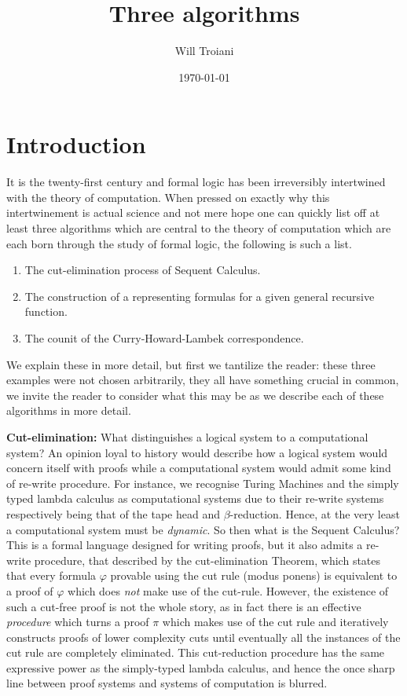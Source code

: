 \documentclass[12pt]{article}
\title{Three algorithms}
\author{Will Troiani}
\date{\today}
\theoremstyle{plain}
\theoremstyle{definition}
\begin{document}
	\maketitle
	\section{Introduction}
	It is the twenty-first century and formal logic has been irreversibly intertwined with the theory of computation. When pressed on exactly why this intertwinement is actual science and not mere hope one can quickly list off at least three algorithms which are central to the theory of computation which are each born through the study of formal logic, the following is such a list.
	\begin{enumerate}
		\item\label{cut_elimination} The cut-elimination process of Sequent Calculus.
		\item\label{representing_formula} The construction of a representing formulas for a given general recursive function.
		\item \label{counit} The counit of the Curry-Howard-Lambek correspondence.
	\end{enumerate}
	We explain these in more detail, but first we tantilize the reader: these three examples were not chosen arbitrarily, they all have something crucial in common, we invite the reader to consider what this may be as we describe each of these algorithms in more detail.
	
	\textbf{Cut-elimination:} What distinguishes a logical system to a computational system? An opinion loyal to history would describe how a logical system would concern itself with proofs while a computational system would admit some kind of re-write procedure. For instance, we recognise Turing Machines and the simply typed lambda calculus as computational systems due to their re-write systems respectively being that of the tape head and $\beta$-reduction. Hence, at the very least a computational system must be \emph{dynamic}. So then what is the Sequent Calculus? This is a formal language designed for writing proofs, but it also admits a re-write procedure, that described by the cut-elimination Theorem, which states that every formula $\varphi$ provable using the cut rule (modus ponens) is equivalent to a proof of $\varphi$ which does \emph{not} make use of the cut-rule. However, the existence of such a cut-free proof is not the whole story, as in fact there is an effective \emph{procedure} which turns a proof $\pi$ which makes use of the cut rule and iteratively constructs proofs of lower complexity cuts until eventually all the instances of the cut rule are completely eliminated. This cut-reduction procedure has the same expressive power as the simply-typed lambda calculus, and hence the once sharp line between proof systems and systems of computation is blurred.
	
\end{document}
